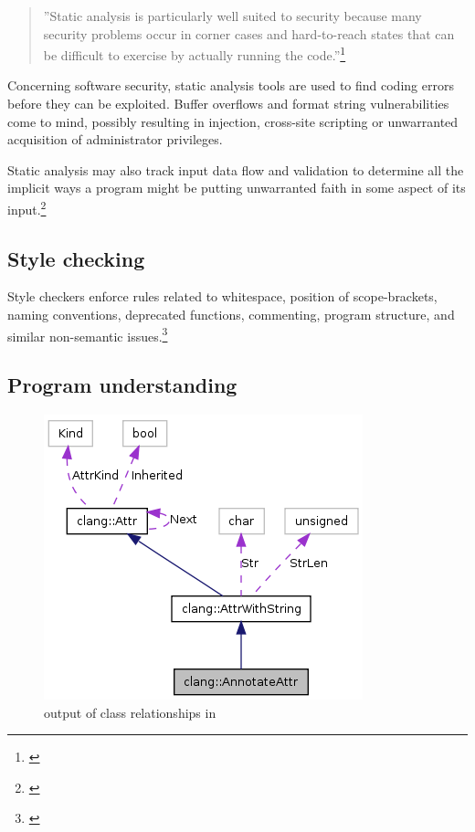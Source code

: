 \begin{quotation}
''Static analysis is particularly well suited to security because many security problems occur in corner cases and hard-to-reach states that can be difficult to exercise by actually running the code.''\footnote{\citep[4]{SecureProgramming}}
\end{quotation}

Concerning software security, static analysis tools are used to find coding errors before they can be exploited. Buffer overflows and format string vulnerabilities come to mind, possibly resulting in  injection, cross-site scripting or unwarranted acquisition of administrator privileges. 

Static analysis may also track input data flow and validation to determine
all the implicit ways a program might be putting unwarranted faith in some aspect of its input.\footnote{\citep[172]{SecureProgramming}}

\subsection{Style checking}

Style checkers enforce rules related to whitespace, position of scope-brackets, naming conventions, deprecated functions, commenting, program structure, and similar non-semantic issues.\footnote{\citep[25]{SecureProgramming}}

\subsection{Program understanding}

\begin{figure}
  \vspace{-20pt}
  \begin{center}
    \includegraphics[scale=0.5]{Images/ClangGraph.png}
  \end{center}
  \caption{ output of class relationships in }
  \label{fig:ClangGraph}
   \vspace{-15pt}
\end{figure}

